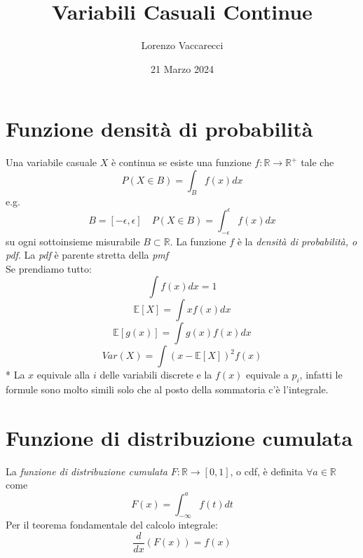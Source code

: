 \documentclass[12pt]{article}
\title{Variabili Casuali Continue}
\author{Lorenzo Vaccarecci}
\date{21 Marzo 2024}
\begin{document}
\maketitle
\section{Funzione densità di probabilità}
Una variabile casuale $X$ è continua se esiste una funzione $f:\mathbb{R}\rightarrow\mathbb{R}^{+}$ tale che
\begin{equation*}
    P(X\in B)=\int_{B}f(x)dx
\end{equation*}
e.g.
\begin{equation*}
    B=[-\epsilon,\epsilon] \quad P(X\in B)=\int_{-\epsilon}^{\epsilon}f(x)dx
\end{equation*}
su ogni sottoinsieme misurabile $B\subset \mathbb{R}$. La funzione $f$ è la \textit{densità di probabilità, o pdf}. La \textit{pdf} è parente stretta della \textit{pmf}
\\Se prendiamo tutto:
\begin{equation*}
    \int f(x)dx = 1
\end{equation*}
\begin{equation*}
    \mathbb{E}[X]=\int xf(x)dx
\end{equation*}
\begin{equation*}
    \mathbb{E}[g(x)]=\int g(x)f(x)dx
\end{equation*}
\begin{equation*}
    Var(X)=\int (x-\mathbb{E}[X])^{2}f(x)
\end{equation*}
* La $x$ equivale alla $i$ delle variabili discrete e la $f(x)$ equivale a $p_{i}$, infatti le formule sono molto simili solo che al posto della sommatoria c'è l'integrale.
\section{Funzione di distribuzione cumulata}
La \textit{funzione di distribuzione cumulata} $F:\mathbb{R}\rightarrow[0,1]$, o cdf, è definita $\forall a \in \mathbb{R}$ come
\begin{equation*}
    F(x)=\int_{-\infty}^{a}f(t)dt
\end{equation*}
Per il teorema fondamentale del calcolo integrale:
\begin{equation*}
    \frac{d}{dx}(F(x))=f(x)
\end{equation*}
\end{document}
